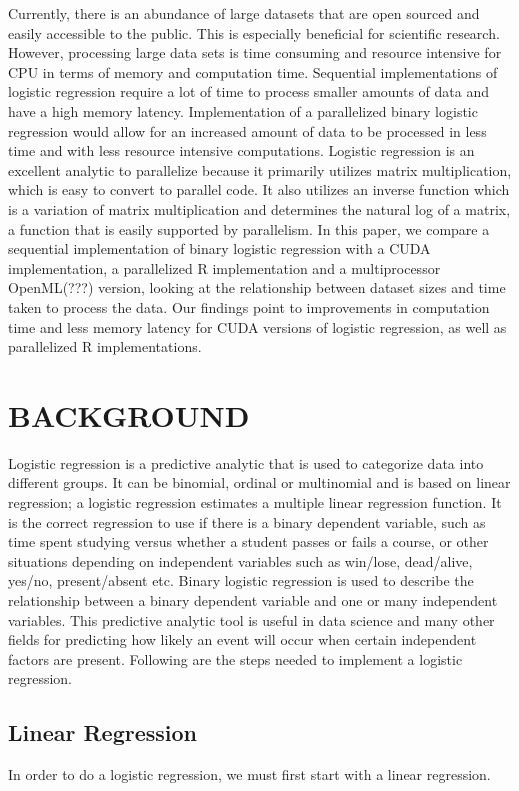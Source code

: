 \documentclass[letterpaper, 10 pt, conference]{ieeeconf}  %
\begin{document}
Currently, there is an abundance of large datasets that are open sourced and easily accessible to the public. This is especially beneficial for scientific research. However, processing large data sets is time consuming and resource intensive for CPU in terms of memory and computation time. Sequential implementations of logistic regression require a lot of time to process smaller amounts of data and have a high memory latency. Implementation of a parallelized binary logistic regression would allow for an increased amount of data to be processed in less time and with less resource intensive computations. Logistic regression is an excellent analytic to parallelize because it primarily utilizes matrix multiplication, which is easy to convert to parallel code. It also utilizes an inverse function which is a variation of matrix multiplication and determines the natural log of a matrix, a function that is easily supported by parallelism. In this paper, we compare a sequential implementation of binary logistic regression with a CUDA implementation, a parallelized R implementation and a multiprocessor OpenML(???) version, looking at the relationship between dataset sizes and time taken to process the data. Our findings point to improvements in computation time and less memory latency for CUDA versions of logistic regression, as well as parallelized R implementations.


\section{BACKGROUND}

Logistic regression is a predictive analytic that is used to categorize data into different groups. It can be binomial, ordinal or multinomial and is based on linear regression; a logistic regression estimates a multiple linear regression function. It is the correct regression to use if there is a binary dependent variable, such as time spent studying versus whether a student passes or fails a course, or other situations depending on independent variables such as win/lose, dead/alive, yes/no, present/absent etc. Binary logistic regression is used to describe the relationship between a binary dependent variable and one or many independent variables. This predictive analytic tool is useful in data science and many other fields for predicting how likely an event will occur when certain independent factors are present. Following are the steps needed to implement a logistic regression.

\subsection{Linear Regression}
In order to do a logistic regression, we must first start with a linear regression.
\end{document}
